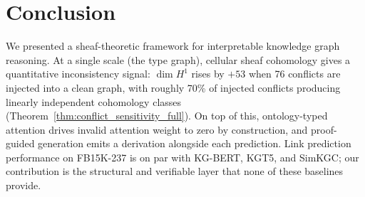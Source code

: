 \section{Conclusion}
\label{sec:conclusion}

We presented a sheaf-theoretic framework for interpretable knowledge graph
reasoning. At a single scale (the type graph), cellular sheaf cohomology
gives a quantitative inconsistency signal: $\dim H^1$ rises by $+53$ when
76 conflicts are injected into a clean graph, with roughly 70\% of
injected conflicts producing linearly independent cohomology classes
(Theorem~\ref{thm:conflict_sensitivity_full}). On top of this, ontology-typed
attention drives invalid attention weight to zero by construction, and
proof-guided generation emits a derivation alongside each prediction. Link
prediction performance on FB15K-237 is on par with KG-BERT, KGT5, and
SimKGC; our contribution is the structural and verifiable layer that none
of these baselines provide.

